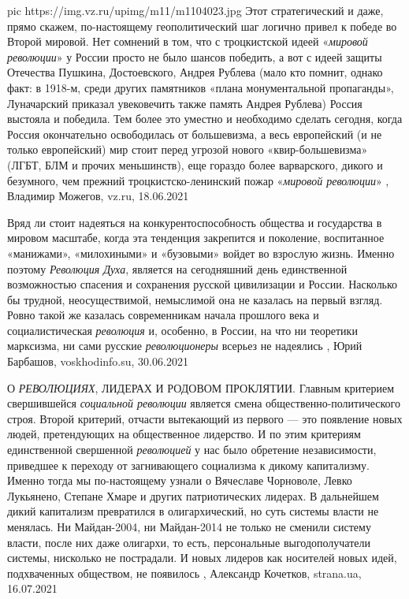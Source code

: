 \ifcmt
  pic https://img.vz.ru/upimg/m11/m1104023.jpg
\fi
Этот стратегический и даже, прямо скажем, по-настоящему геополитический шаг
логично привел к победе во Второй мировой. Нет сомнений в том, что с
троцкистской идеей «\emph{мировой революции}» у России просто не было шансов победить,
а вот с идеей защиты Отечества Пушкина, Достоевского, Андрея Рублева (мало кто
помнит, однако факт: в 1918-м, среди других памятников «плана монументальной
пропаганды», Луначарский приказал увековечить также память Андрея Рублева)
Россия выстояла и победила.  Тем более это уместно и необходимо сделать
сегодня, когда Россия окончательно освободилась от большевизма, а весь
европейский (и не только европейский) мир стоит перед угрозой нового
«квир-большевизма» (ЛГБТ, БЛМ и прочих меньшинств), еще гораздо более
варварского, дикого и безумного, чем прежний троцкистско-ленинский пожар
«\emph{мировой революции}»
, 
Владимир Можегов, vz.ru, 18.06.2021

Вряд ли стоит надеяться на конкурентоспособность общества и государства в
мировом масштабе, когда эта тенденция закрепится и поколение, воспитанное
«манижами», «милохиными» и «бузовыми» войдет во взрослую жизнь.  Именно поэтому
\emph{Революция Духа}, является на сегодняшний день единственной возможностью
спасения и сохранения русской цивилизации и России. Насколько бы трудной,
неосуществимой, немыслимой она не казалась на первый взгляд. Ровно такой же
казалась современникам начала прошлого века и социалистическая \emph{революция}
и, особенно, в России, на что ни теоретики марксизма, ни сами русские
\emph{революционеры} всерьез не надеялись
, 
Юрий Барбашов, voskhodinfo.su, 30.06.2021

О \emph{РЕВОЛЮЦИЯХ}, ЛИДЕРАХ И РОДОВОМ ПРОКЛЯТИИ.
Главным критерием свершившейся \emph{социальной революции} является смена
общественно-политического строя. Второй критерий, отчасти вытекающий из первого
— это появление новых людей, претендующих на общественное лидерство.
И по этим критериям единственной свершенной \emph{революцией} у нас было
обретение независимости, приведшее к переходу от загнивающего социализма к
дикому капитализму. Именно тогда мы по-настоящему узнали о Вячеславе Чорноволе,
Левко Лукьянено, Степане Хмаре и других патриотических лидерах.
В дальнейшем дикий капитализм превратился в олигархический, но суть системы
власти не менялась.  Ни Майдан-2004, ни Майдан-2014 не только не сменили
систему власти, после них даже олигархи, то есть, персональные выгодополучатели
системы, нисколько не пострадали. И новых лидеров как носителей новых идей,
подхваченных обществом, не появилось
, 
Александр Кочетков, strana.ua, 16.07.2021

